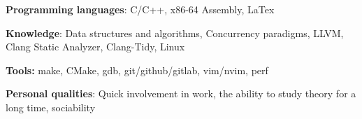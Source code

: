 \textbf{Programming languages}: C/C++, x86-64 Assembly, LaTex

\textbf{Knowledge}: Data structures and algorithms, Concurrency paradigms, LLVM, Clang Static Analyzer, Clang-Tidy, Linux

\textbf{Tools:} make, CMake, gdb, git/github/gitlab, vim/nvim, perf

\textbf{Personal qualities}: Quick involvement in work, the ability to study theory for a long time, sociability